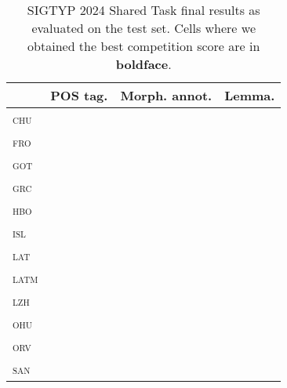 \documentclass{../acl_latex.tex}
\begin{document}
\begin{table}[t]
\centering
\begin{tabular}{lrrr}
\toprule
                 & POS tag. & Morph. annot. & Lemma. \\ \midrule
\textsc{chu}     &          &               &        \\ 
\textsc{fro}     &          &               &        \\
\textsc{got}     &          &               &        \\
\textsc{grc}     &          &               &        \\
\textsc{hbo}     &          &               &        \\
\textsc{isl}     &          &               &        \\
\textsc{lat}     &          &               &        \\
\textsc{latm}    &          &               &        \\
\textsc{lzh}     &          &               &        \\
\textsc{ohu}     &          &               &        \\
\textsc{orv}     &          &               &        \\
\textsc{san}     &          &               &        \\ \bottomrule 
\end{tabular}
\caption{
    SIGTYP 2024 Shared Task final results as evaluated on the test set.
    Cells where we obtained the best competition score are in \textbf{boldface}.
}
\label{table:main_results}
\end{table}
\end{document}

